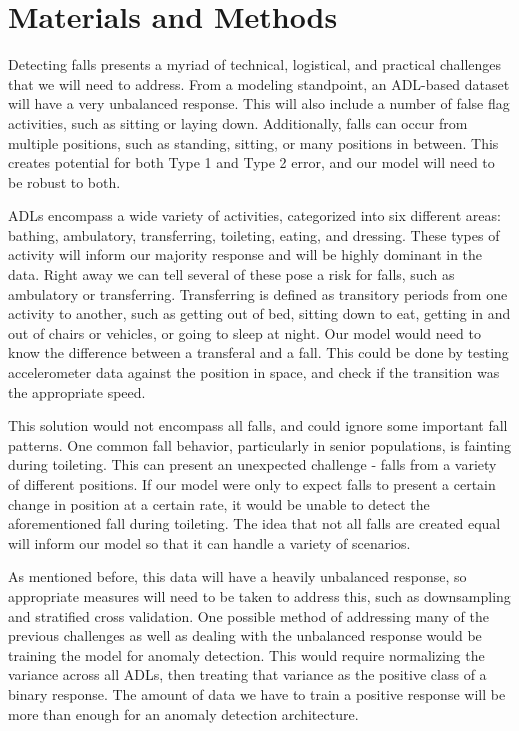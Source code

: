 \documentclass{llncs}
\begin{document}
\begin{table}
\begin{center}
\begin{tabular}{|c|c|c|}
			\bottomrule
		\end{tabular}
	\end{center}
\end{table}   
    
    
\section{Materials and Methods}
	Detecting falls presents a myriad of technical, logistical, and practical challenges that we will need to address. From a modeling standpoint, an ADL-based dataset will have a very unbalanced response. This will also include a number of false flag activities, such as sitting or laying down. Additionally, falls can occur from multiple positions, such as standing, sitting, or many positions in between. This creates potential for both Type 1 and Type 2 error, and our model will need to be robust to both.
    
    ADLs encompass a wide variety of activities, categorized into six different areas: bathing, ambulatory, transferring, toileting, eating, and dressing. These types of activity will inform our majority response and will be highly dominant in the data. Right away we can tell several of these pose a risk for falls, such as ambulatory or transferring. Transferring is defined as transitory periods from one activity to another, such as getting out of bed, sitting down to eat, getting in and out of chairs or vehicles, or going to sleep at night. Our model would need to know the difference between a transferal and a fall. This could be done by testing accelerometer data against the position in space, and check if the transition was the appropriate speed. 
    
    This solution would not encompass all falls, and could ignore some important fall patterns. One common fall behavior, particularly in senior populations, is fainting during toileting. This can present an unexpected challenge - falls from a variety of different positions. If our model were only to expect falls to present a certain change in position at a certain rate, it would be unable to detect the aforementioned fall during toileting. The idea that not all falls are created equal will inform our model so that it can handle a variety of scenarios.
    
    As mentioned before, this data will have a heavily unbalanced response, so appropriate measures will need to be taken to address this, such as downsampling and stratified cross validation. One possible method of addressing many of the previous challenges as well as dealing with the unbalanced response would be training the model for anomaly detection. This would require normalizing the variance across all ADLs, then treating that variance as the positive class of a binary response. The amount of data we have to train a positive response will be more than enough for an anomaly detection architecture.
    
\end{document}
